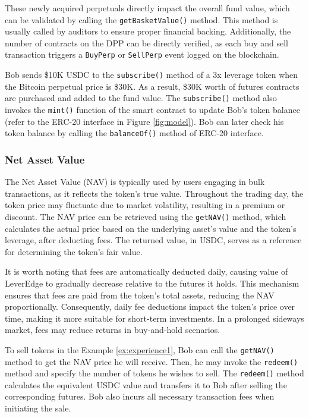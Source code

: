 These newly acquired perpetuals directly impact the overall fund value, which can be validated by calling the \texttt{getBasketValue()} method. This method is usually called by auditors to ensure proper financial backing. Additionally, the number of contracts on the DPP can be directly verified, as each buy and sell transaction triggers a \texttt{BuyPerp} or \texttt{SellPerp} event logged on the blockchain.

\begin{example}\label{ex:experience1}
	Bob sends \$10K USDC to the \texttt{subscribe()} method of a 3x leverage token when the Bitcoin perpetual price is \$30K. As a result, \$30K worth of futures contracts are purchased and added to the fund value. The \texttt{subscribe()} method also invokes the \texttt{mint()} function of the smart contract to update Bob's token balance (refer to the ERC-20 interface in Figure \ref{fig:model}). Bob can later check his token balance by calling the \texttt{balanceOf()} method of ERC-20 interface.
\end{example}

\subsubsection{Net Asset Value}
The Net Asset Value (NAV) is typically used by users engaging in bulk transactions, as it reflects the token's true value. Throughout the trading day, the token price may fluctuate due to market volatility, resulting in a premium or discount. The NAV price can be retrieved using the \texttt{getNAV()} method, which calculates the actual price based on the underlying asset's value and the token's leverage, after deducting fees. The returned value, in USDC, serves as a reference for determining the token's fair value. 

It is worth noting that fees are automatically deducted daily, causing value of LeverEdge to gradually decrease relative to the futures it holds. This mechanism ensures that fees are paid from the token's total assets, reducing the NAV proportionally. Consequently, daily fee deductions impact the token's price over time, making it more suitable for short-term investments. In a prolonged sideways market, fees may reduce returns in buy-and-hold scenarios.

\begin{example}
	To sell tokens in the Example \ref{ex:experience1}, Bob can call the \texttt{getNAV()} method to get the NAV price he will receive. Then, he may invoke the \texttt{redeem()} method and specify the number of tokens he wishes to sell. The \texttt{redeem()} method calculates the equivalent USDC value and transfers it to Bob after selling the corresponding futures. Bob also incurs all necessary transaction fees when initiating the sale.
\end{example}

